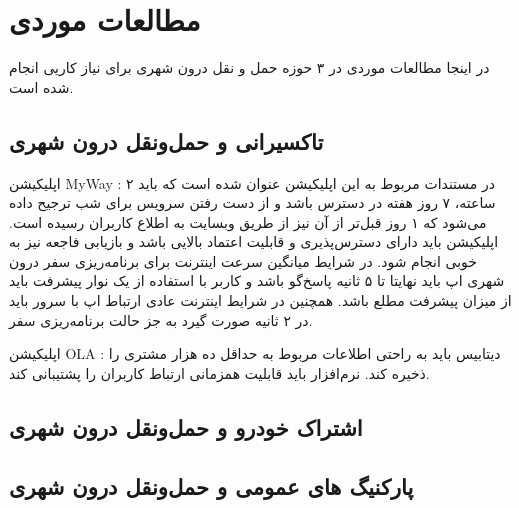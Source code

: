 \section{مطالعات موردی}

در اینجا مطالعات موردی در ۳ حوزه حمل و نقل درون شهری برای نیاز کاریی انجام شده است. 
\subsection{تاکسیرانی و حمل‌و‌نقل درون شهری}

اپلیکیشن MyWay : در مستندات مربوط به این اپلیکیشن عنوان شده است که باید ۲ ساعته، ۷ روز هفته در دسترس باشد و از دست رفتن سرویس برای شب ترجیح داده می‌شود که ۱ روز قبل‌تر از آن نیز از طریق وبسایت به اطلاع کاربران رسیده است. 
اپلیکیشن باید دارای دسترس‌پذیری و قابلیت اعتماد بالایی باشد و بازیابی فاجعه نیز به خوبی انجام شود. در شرایط میانگین سرعت اینترنت برای برنامه‌ریزی سفر درون شهری اپ باید نهایتا تا ۵ ثانیه پاسخ‌گو باشد و کاربر با استفاده از یک نوار پیشرفت باید از میزان پیشرفت مطلع باشد. 
همچنین در شرایط اینترنت عادی ارتباط اپ با سرور باید در ۲ ثانیه صورت گیرد به جز حالت برنامه‌ریزی سفر. 

اپلیکیشن OLA : دیتابیس باید به راحتی اطلاعات مربوط به حداقل ده هزار مشتری را ذخیره کند. نرم‌افزار باید قابلیت همزمانی ارتباط کاربران را پشتیبانی کند.

\subsection{اشتراک خودرو و حمل‌و‌نقل درون شهری}


\subsection{پارکنیگ های عمومی و حمل‌و‌نقل درون شهری}




